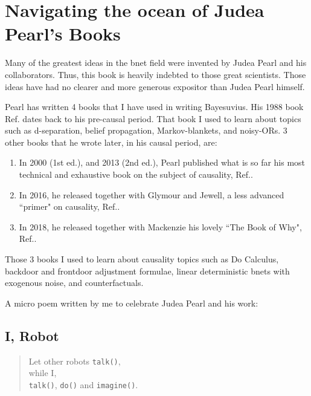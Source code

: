 \chapter{Navigating 
the ocean of Judea Pearl's Books}

\label{ch-nav-pearl}
Many
of the
greatest ideas 
in the bnet field 
were invented by Judea Pearl
and his collaborators.
Thus, this book is 
heavily indebted to
those great scientists.
Those ideas have had no clearer
and more generous 
expositor than Judea Pearl
himself.

Pearl has written
4 books that I have used
in writing Bayesuvius.
His 
1988 book Ref.\cite{pearl-1988book}
dates back to his pre-causal period.
That book I used to learn
about topics such as
d-separation, belief propagation,
Markov-blankets, and noisy-ORs.
3 other books that  he  wrote later,
in his causal period, 
are:
\begin{enumerate}
\item
In 2000 (1st ed.), and 2013 (2nd ed.),
Pearl published what
is so far
his most technical
and exhaustive book
on the subject of causality,
Ref.\cite{pearl-2013book}.
\item
In 2016,
he released 
together
with Glymour and Jewell,
a less advanced ``primer"
on causality, Ref.\cite{pearl-primer}.
\item
In 2018, 
he released 
together with
Mackenzie his
lovely  ``The Book of Why",
 Ref.\cite{book-why}.
\end{enumerate}
Those 3 books I used to learn
about causality topics
such as Do Calculus,
backdoor and frontdoor
adjustment formulae,
linear 
deterministic 
bnets with exogenous noise,
and counterfactuals.

A micro poem written by me
to celebrate Judea Pearl and 
his work:
 
\section*{I, Robot}
\begin{verse}
Let other robots {\tt talk()},\\
while I,\\
{\tt talk()}, {\tt do()} and {\tt imagine()}.
\end{verse}
